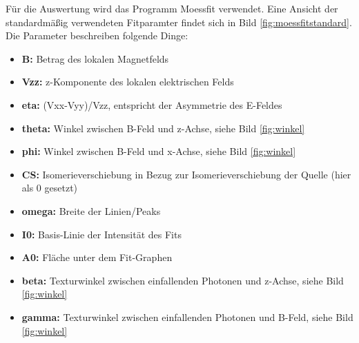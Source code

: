 \documentclass[german, %
parskip=full, %
bibliography=totoc, %
]{scrartcl}
\begin{document}
Für die Auswertung wird das Programm Moessfit verwendet. Eine Ansicht der standardmäßig verwendeten Fitparamter findet sich in Bild \ref{fig:moessfitstandard}. Die Parameter beschreiben folgende Dinge:
\begin{itemize}
\item \textbf{B:} Betrag des lokalen Magnetfelds
\item \textbf{Vzz:} z-Komponente des lokalen elektrischen Felds
\item \textbf{eta:} (Vxx-Vyy)/Vzz, entspricht der Asymmetrie des E-Feldes
\item \textbf{theta:} Winkel zwischen B-Feld und z-Achse, siehe Bild \ref{fig:winkel}
\item \textbf{phi:} Winkel zwischen B-Feld und x-Achse, siehe Bild \ref{fig:winkel}
\item \textbf{CS:} Isomerieverschiebung in Bezug zur Isomerieverschiebung der Quelle (hier als 0 gesetzt)
\item \textbf{omega:} Breite der Linien/Peaks
\item \textbf{I0:} Basis-Linie der Intensität des Fits
\item \textbf{A0:} Fläche unter dem Fit-Graphen
\item \textbf{beta:} Texturwinkel zwischen einfallenden Photonen und z-Achse, siehe Bild \ref{fig:winkel}
\item \textbf{gamma:} Texturwinkel zwischen einfallenden Photonen und B-Feld, siehe Bild \ref{fig:winkel}
\end{itemize}
\end{document}
